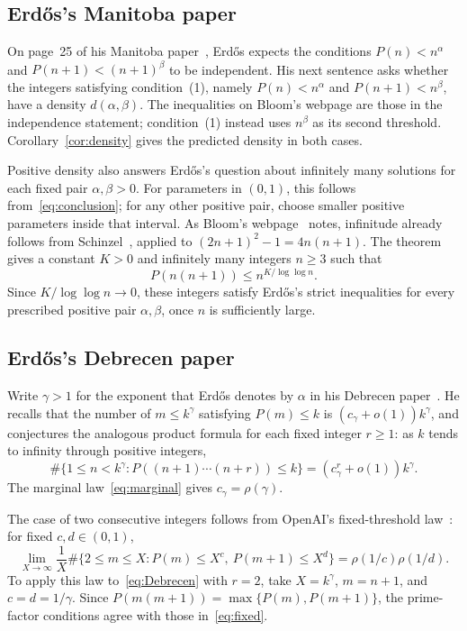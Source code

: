 \documentclass[11pt,a4paper]{amsart}
\begin{document}
\subsection{Erd\H{o}s's Manitoba paper}
On page~25 of his Manitoba paper~\cite{Erdos1976Manitoba},
Erd\H{o}s expects the conditions $P(n)<n^\alpha$ and
$P(n+1)<(n+1)^\beta$ to be independent. His next sentence asks whether
the integers satisfying condition~(1), namely $P(n)<n^\alpha$ and
$P(n+1)<n^\beta$, have a density $d(\alpha,\beta)$.
The inequalities on Bloom's webpage are those in the independence
statement; condition~(1) instead uses $n^\beta$ as its second threshold.
Corollary~\ref{cor:density} gives the predicted density in both cases.

Positive density also answers Erd\H{o}s's question about infinitely
many solutions for each fixed pair $\alpha,\beta>0$.
For parameters in $(0,1)$, this follows from~\eqref{eq:conclusion};
for any other positive pair, choose smaller positive parameters inside
that interval. As Bloom's webpage~\cite{Bloom928} notes, infinitude
already follows from
Schinzel~\cite[Theorem~14, p.~231]{Schinzel1967}, applied to
$(2n+1)^2-1=4n(n+1)$. The theorem gives a constant $K>0$ and infinitely
many integers $n\ge3$ such that
\[
 P(n(n+1))\le n^{K/\log\log n}.
\]
Since $K/\log\log n\to0$, these integers satisfy Erd\H{o}s's strict
inequalities for every prescribed positive pair $\alpha,\beta$, once
$n$ is sufficiently large.

\subsection{Erd\H{o}s's Debrecen paper}\label{subsec:debrecen}
Write $\gamma>1$ for the exponent that Erd\H{o}s denotes by $\alpha$
in his Debrecen paper~\cite[pp.~272--273]{Erdos1976Debrecen}.
He recalls that the number of $m\le k^\gamma$ satisfying $P(m)\le k$
is $(c_\gamma+o(1))k^\gamma$, and conjectures the analogous product
formula for each fixed integer $r\ge1$: as $k$ tends to infinity
through positive integers,
\begin{equation}\label{eq:Debrecen}
 \#\{1\le n<k^\gamma:P((n+1)\cdots(n+r))\le k\}
  =(c_\gamma^r+o(1))k^\gamma.
\end{equation}
The marginal law~\eqref{eq:marginal} gives $c_\gamma=\rho(\gamma)$.

The case of two consecutive integers follows from OpenAI's
fixed-threshold law~\cite[(11.7), p.~80]{OpenAI2026}: for fixed
$c,d\in(0,1)$,
\begin{equation}\label{eq:fixed}
 \lim_{X\to\infty}\frac1X
 \#\{2\le m\le X:P(m)\le X^c,\ P(m+1)\le X^d\}
 =\rho(1/c)\rho(1/d).
\end{equation}
To apply this law to~\eqref{eq:Debrecen} with $r=2$, take $X=k^\gamma$,
$m=n+1$, and $c=d=1/\gamma$.
Since $P(m(m+1))=\max\{P(m),P(m+1)\}$, the prime-factor conditions
agree with those in~\eqref{eq:fixed}.
\end{document}
